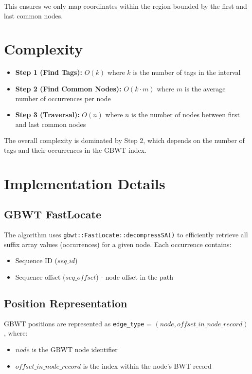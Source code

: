\documentclass[11pt]{article}
\begin{document}
This ensures we only map coordinates within the region bounded by the first and last common nodes.

\section{Complexity}

\begin{itemize}
    \item \textbf{Step 1 (Find Tags):} $O(k)$ where $k$ is the number of tags in the interval
    \item \textbf{Step 2 (Find Common Nodes):} $O(k \cdot m)$ where $m$ is the average number of occurrences per node
    \item \textbf{Step 3 (Traversal):} $O(n)$ where $n$ is the number of nodes between first and last common nodes
\end{itemize}

The overall complexity is dominated by Step 2, which depends on the number of tags and their occurrences in the GBWT index.

\section{Implementation Details}

\subsection{GBWT FastLocate}

The algorithm uses \texttt{gbwt::FastLocate::decompressSA()} to efficiently retrieve all suffix array values (occurrences) for a given node. Each occurrence contains:
\begin{itemize}
    \item Sequence ID ($seq\_id$)
    \item Sequence offset ($seq\_offset$) - node offset in the path
\end{itemize}

\subsection{Position Representation}

GBWT positions are represented as \texttt{edge\_type} = $(node, offset\_in\_node\_record)$, where:
\begin{itemize}
    \item $node$ is the GBWT node identifier
    \item $offset\_in\_node\_record$ is the index within the node's BWT record
\end{itemize}
\end{document}
